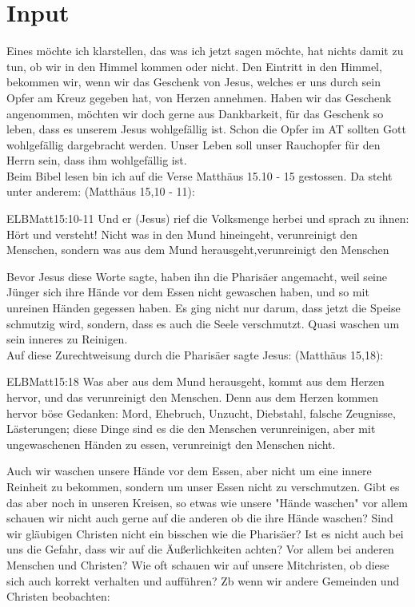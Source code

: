 \section{ Input }
Eines möchte ich klarstellen, das was ich jetzt sagen möchte, hat nichts damit zu tun, ob wir in den Himmel kommen oder nicht. Den Eintritt in den Himmel, bekommen wir, wenn wir das Geschenk von Jesus, welches er uns durch sein Opfer am Kreuz gegeben hat, von Herzen annehmen. Haben wir das Geschenk angenommen, möchten wir doch gerne aus Dankbarkeit, für das Geschenk so leben, dass es unserem Jesus wohlgefällig ist. Schon die Opfer im AT sollten Gott wohlgefällig dargebracht werden. Unser Leben soll unser Rauchopfer für den Herrn sein, dass ihm wohlgefällig ist.\\
Beim Bibel lesen bin ich auf die Verse Matthäus 15.10 - 15 gestossen. Da steht unter anderem:
(Matthäus 15,10 - 11):
\begin{bibelbox}{ELB}{Matt}{15:10-11}
Und er (Jesus) rief die Volksmenge herbei und sprach zu ihnen: \glqq{}Hört und versteht! Nicht was in den Mund hineingeht, verunreinigt den Menschen, sondern was aus dem Mund herausgeht,verunreinigt den Menschen\grqq
\end{bibelbox}
Bevor Jesus diese Worte sagte, haben ihn die Pharisäer angemacht, weil seine Jünger sich ihre Hände vor dem Essen nicht gewaschen haben, und so mit unreinen Händen gegessen haben. Es ging nicht nur darum, dass jetzt die Speise schmutzig wird, sondern, dass es auch die Seele verschmutzt. Quasi waschen um sein inneres zu Reinigen.\\
Auf diese Zurechtweisung durch die Pharisäer sagte Jesus:
(Matthäus 15,18):
\begin{bibelbox}{ELB}{Matt}{15:18}
\glqq{}Was aber aus dem Mund herausgeht, kommt aus dem Herzen hervor, und das verunreinigt den Menschen. Denn aus dem Herzen kommen hervor böse Gedanken: Mord, Ehebruch, Unzucht, Diebstahl, falsche Zeugnisse, Lästerungen; diese Dinge sind es die den Menschen verunreinigen, aber mit ungewaschenen Händen zu essen, verunreinigt den Menschen nicht.\grqq
\end{bibelbox}
Auch wir waschen unsere Hände vor dem Essen, aber nicht um eine innere Reinheit zu bekommen, sondern um unser Essen nicht zu verschmutzen. Gibt es das aber noch in unseren Kreisen, so etwas wie unsere "Hände waschen" vor allem schauen wir nicht auch gerne auf die anderen ob die ihre Hände waschen? Sind wir gläubigen Christen nicht ein bisschen wie die Pharisäer? Ist es nicht auch bei uns die Gefahr, dass wir auf die Äußerlichkeiten achten? Vor allem bei anderen Menschen und Christen? Wie oft schauen wir auf unsere Mitchristen, ob diese sich auch korrekt verhalten und aufführen? Zb wenn wir andere Gemeinden und Christen beobachten: 
